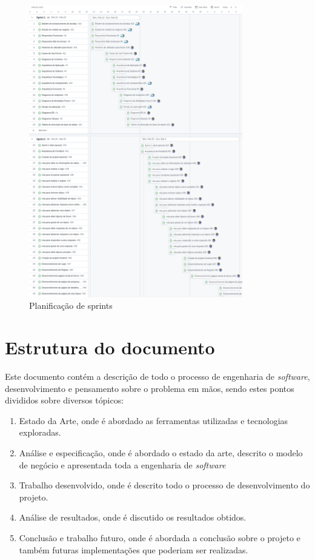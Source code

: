 \begin{figure}[htb]
  \centering
  
  \includegraphics[width=0.83\textwidth]{images/etapa1_sprint_planning.png}
  \caption{Planificação de sprints}
  \label{fig:1}
\end{figure}

\section{Estrutura do documento}

Este documento contém a descrição de todo o processo de engenharia de \textit{software}, desenvolvimento e pensamento sobre o problema em mãos, sendo estes pontos divididos sobre diversos tópicos:
\begin{enumerate}
  \item Estado da Arte, onde é abordado as ferramentas utilizadas e tecnologias exploradas.
  \item Análise e especificação, onde é abordado o estado da arte, descrito o modelo de negócio e apresentada toda a engenharia de \textit{software}
  \item Trabalho desenvolvido, onde é descrito todo o processo de desenvolvimento do projeto.
  \item Análise de resultados, onde é discutido os resultados obtidos.
  \item Conclusão e trabalho futuro, onde é abordada a conclusão sobre o projeto e também futuras implementações que poderiam ser realizadas.
\end{enumerate}